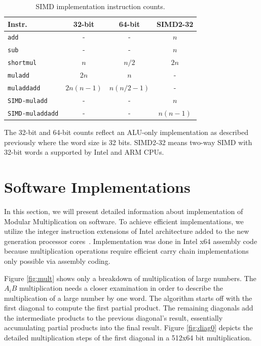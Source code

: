 \documentclass[twocolumn]{svjour3}          %
\begin{document}
\begin{table}
\caption{SIMD implementation instruction counts.}
\label{simdCounts}
\begin{tabular}{|l||c|c|c|} \hline
Instr. & 32-bit & 64-bit & SIMD2-32 \\
\hline\hline
\texttt{add} & - & - & $n$ \\
\texttt{sub} & - & - & $n$ \\
\texttt{shortmul} & $n$ & $n/2$ & $2n$ \\
\texttt{muladd} & $2n$ & $n$ & - \\
\texttt{muladdadd} & $2n(n-1)$ & $n(n/2-1)$ & - \\
\texttt{SIMD-muladd} & - & - & $n$ \\
\texttt{SIMD-muladdadd} & - & - & $n(n-1)$ \\
\hline
\end{tabular}
\end{table}
%
\noindent
The 32-bit and 64-bit counts reflect an ALU-only implementation as described previously where the word size is 32 bits.
SIMD2-32 means two-way SIMD with 32-bit words a supported by Intel and ARM CPUs.

\section{Software Implementations}
\label{sec:softimp}

In this section, we will present detailed information about implementation of Modular Multiplication on software. To achieve efficient implementations, we utilize the integer instruction extensions of Intel architecture added to the new generation processor cores~\cite{largeint}. Implementation was done in Intel x64 assembly code because multiplication operations require efficient carry chain implementations only possible via assembly coding.

Figure \ref{fig:mult} shows only a breakdown of multiplication of large numbers. The $A_iB$ multiplication needs a closer examination in order to describe the multiplication of a large number by one word.
%
The algorithm starts off with the first diagonal to compute the first partial product.
The remaining diagonals add the intermediate products to the previous diagonal's result, essentially accumulating
partial products into the final result.
%
Figure \ref{fig:diag0} depicts the detailed multiplication steps of the first diagonal in a 512x64 bit multiplication.
\end{document}
